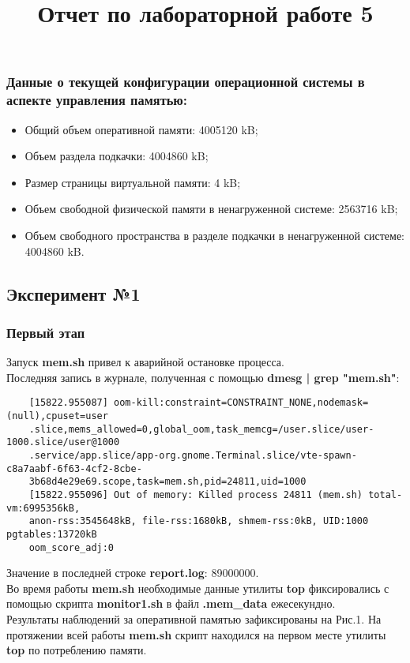 \documentclass{article}
\begin{document}
\title{Отчет по лабораторной работе 5}
\date{}
\maketitle

\subsubsection*{Данные о текущей конфигурации операционной системы в аспекте управления памятью:}
\begin{itemize}
    \item Общий объем оперативной памяти: 4005120 kB;
    \item Объем раздела подкачки: 4004860 kB;
    \item Размер страницы виртуальной памяти: 4 kB;
    \item Объем свободной физической памяти в ненагруженной системе: 2563716 kB;
    \item Объем свободного пространства в разделе подкачки в ненагруженной системе: 4004860 kB.
\end{itemize}

\bigskip

\subsection*{Эксперимент №1}

\subsubsection*{Первый этап}
Запуск \textbf{mem.sh} привел к аварийной остановке процесса. \\
Последняя запись в журнале, полученная с помощью \textbf{dmesg | grep "mem.sh"}:
\begin{verbatim}
    [15822.955087] oom-kill:constraint=CONSTRAINT_NONE,nodemask=(null),cpuset=user
    .slice,mems_allowed=0,global_oom,task_memcg=/user.slice/user-1000.slice/user@1000
    .service/app.slice/app-org.gnome.Terminal.slice/vte-spawn-c8a7aabf-6f63-4cf2-8cbe-
    3b68d4e29e69.scope,task=mem.sh,pid=24811,uid=1000
    [15822.955096] Out of memory: Killed process 24811 (mem.sh) total-vm:6995356kB, 
    anon-rss:3545648kB, file-rss:1680kB, shmem-rss:0kB, UID:1000 pgtables:13720kB 
    oom_score_adj:0
\end{verbatim}
Значение в последней строке \textbf{report.log}: 89000000. \\
Во время работы \textbf{mem.sh} необходимые данные утилиты \textbf{top} фиксировались с помощью скрипта \textbf{monitor1.sh} в файл \textbf{.mem\_data} ежесекундно. \\
Результаты наблюдений за оперативной памятью зафиксированы на Рис.1. На протяжении всей работы \textbf{mem.sh} скрипт находился на первом месте утилиты \textbf{top} по потреблению  памяти.
\end{document}
